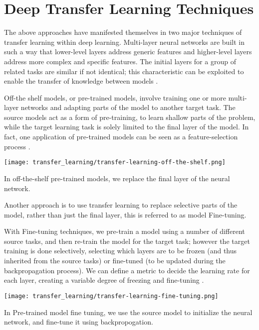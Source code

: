 \section{Deep Transfer Learning Techniques}\label{sec:transfer-learning-deep-techniques}

The above approaches have manifested themselves in two major techniques of transfer learning within deep learning. Multi-layer neural networks are built in such a way that lower-level layers address generic features and higher-level layers address more complex and specific features. The initial layers for a group of related tasks are similar if not identical; this characteristic can be exploited to enable the transfer of knowledge between models \citep{yosinski2014}. 



Off-the shelf models, or pre-trained models, involve training one or more multi-layer networks and adapting parts of the model to another target task. The source models act as a form of pre-training, to learn shallow parts of the problem, while the target learning task is solely limited to the final layer of the model. In fact, one application of pre-trained models can be seen as a feature-selection process \citep{zhu2018}. 

\begin{marginfigure}
  \texttt{[image: transfer\_learning/transfer-learning-off-the-shelf.png]}
  \caption{In off-the-shelf pre-trained models, we replace the final layer of the neural network.}
  \label{fig:transferlearning_pretrained_ots}
\end{marginfigure}

Another approach is to use transfer learning to replace selective parts of the model, rather than just the final layer, this is referred to as model Fine-tuning. 

With Fine-tuning techniques, we pre-train a model using a number of different source tasks, and then re-train the model for the target task; however the target training is done selectively, selecting which layers are to be frozen (and thus inherited from the source tasks) or fine-tuned (to be updated during the backpropagation process). We can define a metric to decide the learning rate for each layer, creating a variable degree of freezing and fine-tuning \citep{madhavan2016}. 

\begin{marginfigure}
  \texttt{[image: transfer\_learning/transfer-learning-fine-tuning.png]}
  \caption{In Pre-trained model fine tuning, we use the source model to initialize the neural network, and fine-tune it using backpropogation.}
  \label{fig:transferlearning_pretrained_finetuning}
 
\end{marginfigure}

